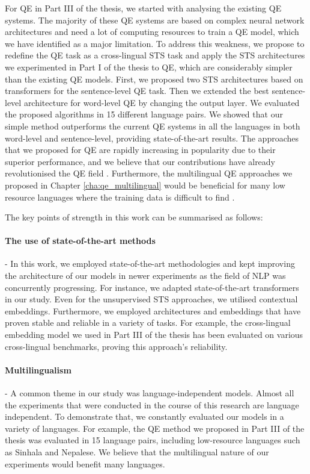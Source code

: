 For QE in Part III of the thesis, we started with analysing the existing QE systems. The majority of these QE systems are based on complex neural network architectures and need a lot of computing resources to train a QE model, which we have identified as a major limitation. To address this weakness, we propose to redefine the QE task as a cross-lingual STS task and apply the STS architectures we experimented in Part I of the thesis to QE, which are considerably simpler than the existing QE models. First, we proposed two STS architectures based on transformers for the sentence-level QE task. Then we extended the best sentence-level architecture for word-level QE by changing the output layer. We evaluated the proposed algorithms in 15 different language pairs. We showed that our simple method outperforms the current QE systems in all the languages in both word-level and sentence-level, providing state-of-the-art results.  The approaches that we proposed for QE are rapidly increasing in popularity due to their superior performance, and we believe that our contributions have already revolutionised the QE field \autocite{ranasinghe-etal-2020-transquest, ranasinghe-etal-2020-transquest-wmt2020}.  Furthermore, the multilingual QE approaches we proposed in Chapter \ref{cha:qe_multilingual} would be beneficial for many low resource languages where the training data is difficult to find \autocite{ranasinghe-etal-2021-exploratory}.

The key points of strength in this work can be summarised as follows:


\paragraph{The use of state-of-the-art methods} - In this work, we employed state-of-the-art methodologies and kept improving the architecture of our models in newer experiments as the field of NLP was concurrently progressing. For instance, we adapted state-of-the-art transformers in our study. Even for the unsupervised STS approaches, we utilised contextual embeddings. Furthermore, we employed architectures and embeddings that have proven stable and reliable in a variety of tasks. For example, the cross-lingual embedding model we used in Part III of the thesis has been evaluated on various cross-lingual benchmarks, proving this approach's reliability.

\paragraph{Multilingualism} - A common theme in our study was language-independent models. Almost all the experiments that were conducted in the course of this research are language independent. To demonstrate that, we constantly evaluated our models in a variety of languages. For example, the QE method we proposed in Part III of the thesis was evaluated in 15 language pairs, including low-resource languages such as Sinhala and Nepalese. We believe that the multilingual nature of our experiments would benefit many languages. 

